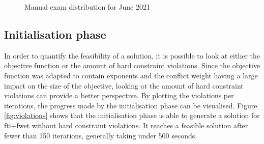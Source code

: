 \begin{figure}[H]
  \centering
  \hfill
  \caption{Manual exam distribution for June 2021}
  \label{fig:manual_sem2}
\end{figure}

\subsection{Initialisation phase}

In order to quantify the feasibility of a solution, it is possible to look at either the objective function or the amount of hard constraint violations. Since the objective function was adapted to contain exponents and the conflict weight having a large impact on the size of the objective, looking at the amount of hard constraint violations can provide a better perspective. By plotting the violations per iterations, the progress made by the initialisation phase can be visualised. Figure \ref{fig:violations} shows that the initialisation phase is able to generate a solution for \acrshort{fti}+\acrshort{fwet} without hard constraint violations. It reaches a feasible solution after fewer than 150 iterations, generally taking under 500 seconds. 

